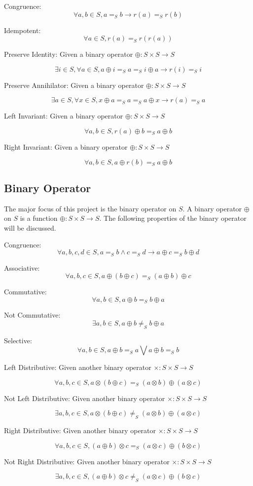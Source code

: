 \documentclass[a4paper,12pt,twoside,openright]{report}
\newcommand{\e}[2]{
\begin{equation}
  \label{#1} 
  #2
\end{equation}
}
\begin{document}
Congruence: \e{def:uop:congruence}{\forall a,b \in S, a =_S b \rightarrow r(a) =_S r(b)}
Idempotent: \e{def:uop:idempotent}{\forall a \in S, r(a) =_S r(r(a))}
Preserve Identity: Given a binary operator $\oplus : S \times S \rightarrow S$
\e{def:uop:preserve_id}{\exists i \in S, \forall a \in S, a \oplus i =_S a =_S i \oplus a \rightarrow r(i) =_S i}
Preserve Annihilator: Given a binary operator $\oplus : S \times S \rightarrow S$
\e{def:uop:preserve_ann}{\exists a \in S, \forall x \in S, x \oplus a =_S a =_S a \oplus x \rightarrow r(a) =_S a}
Left Invariant: Given a binary operator $\oplus : S \times S \rightarrow S$
\e{def:uop:left_invariant}{\forall a,b \in S, r(a) \oplus b =_S a \oplus b}
Right Invariant: Given a binary operator $\oplus : S \times S \rightarrow S$
\e{def:uop:right_invariant}{\forall a,b \in S, a \oplus r(b) =_S a \oplus b}

\subsection{Binary Operator}
The major focus of this project is the binary operator on $S$. A binary operator $\oplus$ on $S$ is a function $\oplus : S \times S \rightarrow S$. The following properties of the binary operator will be discussed. 

Congruence: \e{def:bop:congruence}{\forall a,b,c,d \in S, a =_S b \wedge c =_S d \rightarrow a \oplus c =_S b \oplus d}
Associative: \e{def:bop:associative}{\forall a,b,c \in S, a \oplus (b \oplus c) =_S (a \oplus b) \oplus c}
Commutative: \e{def:bop:commutative}{\forall a,b \in S, a \oplus b =_S b \oplus a}
Not Commutative: \e{def:bop:not_commutative}{\exists a,b \in S, a \oplus b \neq_S b \oplus a}
Selective: \e{def:bop:selective}{\forall a,b \in S, a \oplus b =_S a \bigvee a \oplus b =_S b}
Left Distributive: Given another binary operator $\times : S \times S \rightarrow S$
\e{def:bop:left_distributive}{\forall a,b,c \in S, a \otimes (b \oplus c) =_S (a \otimes b) \oplus (a \otimes c)}
Not Left Distributive: Given another binary operator $\times : S \times S \rightarrow S$
\e{def:bop:not_left_distributive}{\exists a,b,c \in S, a \otimes (b \oplus c) \neq_S (a \otimes b) \oplus (a \otimes c)}
Right Distributive: Given another binary operator $\times : S \times S \rightarrow S$
\e{def:bop:right_distributive}{\forall a,b,c \in S, (a \oplus b) \otimes c =_S (a \otimes c) \oplus (b \otimes c)}
Not Right Distributive: Given another binary operator $\times : S \times S \rightarrow S$
\e{def:bop:not_right_distributive}{\exists a,b,c \in S, (a \oplus b) \otimes c \neq_S (a \otimes c) \oplus (b \otimes c)}
\end{document}
